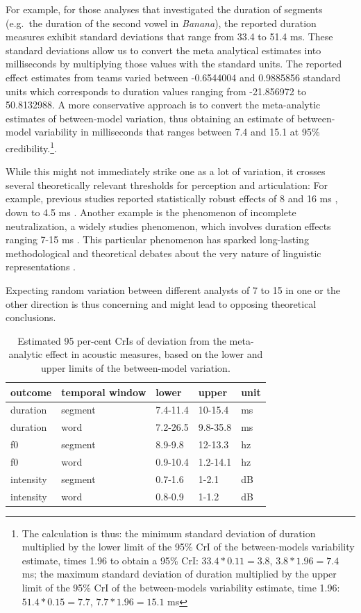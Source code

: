 \documentclass[Review,times,sageh]{sagej}
\begin{document}
For example, for those analyses that investigated the duration of segments (e.g.~the duration of the second vowel in \emph{Banana}), the reported duration measures exhibit standard deviations that range from 33.4 to 51.4 ms.
These standard deviations allow us to convert the meta analytical estimates into milliseconds by multiplying those values with the standard units.
The reported effect estimates from teams varied between -0.6544004 and 0.9885856 standard units which corresponds to duration values ranging from -21.856972 to 50.8132988.
A more conservative approach is to convert the meta-analytic estimates of between-model variation, thus obtaining an estimate of between-model variability in milliseconds that ranges between 7.4 and 15.1 at 95\% credibility.\footnote{The calculation is thus: the minimum standard deviation of duration multiplied by the lower limit of the 95\% CrI of the between-models variability estimate, times 1.96 to obtain a 95\% CrI: \(33.4 * 0.11 = 3.8\), \(3.8 * 1.96 = 7.4\) ms; the maximum standard deviation of duration multiplied by the upper limit of the 95\% CrI of the between-models variability estimate, time 1.96: \(51.4 * 0.15 = 7.7\), \(7.7 * 1.96 = 15.1\) ms}.

While this might not immediately strike one as a lot of variation, it crosses several theoretically relevant thresholds for perception and articulation:
For example, previous studies reported statistically robust effects of 8 and 16 ms \citep{coretta2019}, down to 4.5 ms \citep{nowak2006}.
Another example is the phenomenon of incomplete neutralization, a widely studies phenomenon, which involves duration effects ranging 7-15 ms \citep{nicenboim2018using}.
This particular phenomenon has sparked long-lasting methodological and theoretical debates about the very nature of linguistic representations \citep{port2005against}.

Expecting random variation between different analysts of 7 to 15 in one or the other direction is thus concerning and might lead to opposing theoretical conclusions.

\begin{table}

\caption{\label{tab:msa-sd-table}Estimated 95 per-cent CrIs of deviation from the meta-analytic effect in acoustic measures, based on the lower and upper limits of the between-model variation.}
\centering
\fontsize{11}{13}\selectfont
\begin{tabular}[t]{lllll}
\toprule
outcome & temporal window & lower & upper & unit\\
\midrule
duration & segment & 7.4-11.4 & 10-15.4 & ms\\
duration & word & 7.2-26.5 & 9.8-35.8 & ms\\
f0 & segment & 8.9-9.8 & 12-13.3 & hz\\
f0 & word & 0.9-10.4 & 1.2-14.1 & hz\\
intensity & segment & 0.7-1.6 & 1-2.1 & dB\\
intensity & word & 0.8-0.9 & 1-1.2 & dB\\
\bottomrule
\end{tabular}
\end{table}
\end{document}
